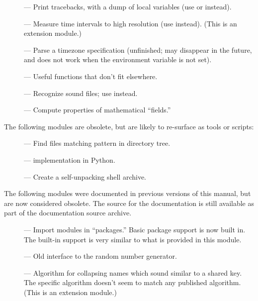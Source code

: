 \begin{description}
\item[]
--- Print tracebacks, with a dump of local variables (use
 or  instead).

\item[]
--- Measure time intervals to high resolution (use
 instead).  (This is an extension module.)

\item[]
--- Parse a timezone specification (unfinished; may disappear in the
future, and does not work when the  environment variable is
not set).

\item[]
--- Useful functions that don't fit elsewhere.

\item[]
--- Recognize sound files; use  instead.

\item[]
--- Compute properties of mathematical ``fields.''
\end{description}


The following modules are obsolete, but are likely to re-surface as
tools or scripts:

\begin{description}
\item[]
--- Find files matching pattern in directory tree.

\item[]
---  implementation in Python.

\item[]
--- Create a self-unpacking \UNIX{} shell archive.
\end{description}


The following modules were documented in previous versions of this
manual, but are now considered obsolete.  The source for the
documentation is still available as part of the documentation source
archive.

\begin{description}
\item[]
--- Import modules in ``packages.''  Basic package support is now
built in.  The built-in support is very similar to what is provided in
this module.

\item[]
--- Old interface to the random number generator.

\item[]
--- Algorithm for collapsing names which sound similar to a shared
key.  The specific algorithm doesn't seem to match any published
algorithm.  (This is an extension module.)
\end{description}


